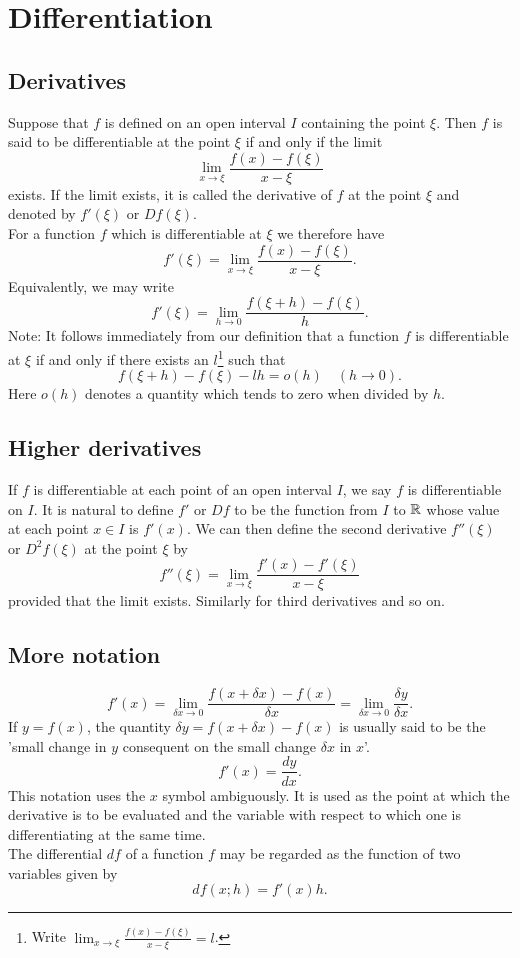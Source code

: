 \documentclass[10pt, a4paper]{article}
\begin{document}
\newpage

\section{Differentiation}

\subsection{Derivatives}
Suppose that $f$ is defined on an open interval $I$ containing the point $\xi$. Then $f$ is said to be differentiable at the point $\xi$ if and only if the limit
\[
\lim_{x \rightarrow \xi}{\dfrac{f(x) - f(\xi)}{x - \xi}}
\]
exists. If the limit exists, it is called the derivative of $f$ at the point $\xi$ and denoted by $f'(\xi)$ or $Df(\xi)$. \\
For a function $f$ which is differentiable at $\xi$ we therefore have
\[
f'(\xi) = \lim_{x \rightarrow \xi}{\dfrac{f(x) - f(\xi)}{x - \xi}}.
\]
Equivalently, we may write
\[
f'(\xi) = \lim_{h \rightarrow 0}{\dfrac{f(\xi + h) - f(\xi)}{h}}.
\]
Note: It follows immediately from our definition that a function $f$ is differentiable at $\xi$ if and only if there exists an $l$\footnote{Write $\lim_{x \rightarrow \xi}{\frac{f(x) - f(\xi)}{x - \xi}} = l$.} such that
\[f(\xi + h) - f(\xi) - lh = o(h)\quad(h \rightarrow 0).\]
Here $o(h)$ denotes a quantity which tends to zero when divided by $h$.

\subsection{Higher derivatives}
If $f$ is differentiable at each point of an open interval $I$, we say $f$ is differentiable on $I$. It is natural to define $f'$ or $Df$ to be the function from $I$ to $\mathbb{R}$ whose value at each point $x \in I$ is $f'(x)$. We can then define the second derivative $f''(\xi)$ or $D ^ 2 f(\xi)$ at the point $\xi$ by
\[
f''(\xi) = \lim_{x \rightarrow \xi}{\dfrac{f'(x) - f'(\xi)}{x - \xi}}
\]
provided that the limit exists. Similarly for third derivatives and so on.

\subsection{More notation}
\[
f'(x) = \lim_{\delta x \rightarrow 0}{\dfrac{f(x + \delta x) - f(x)}{\delta x}} = \lim_{\delta x \rightarrow 0}{\dfrac{\delta y}{\delta x}}.
\]
If $y = f(x)$, the quantity $\delta y = f(x + \delta x) - f(x)$ is usually said to be the 'small change in $y$ consequent on the small change $\delta x$ in $x$'.
\[
f'(x) = \dfrac{dy}{dx}.
\]
This notation uses the $x$ symbol ambiguously. It is used as the point at which the derivative is to be evaluated and the variable with respect to which one is differentiating at the same time. \\
The differential $df$ of a function $f$ may be regarded as the function of two variables given by
\[
df(x; h) = f'(x)h.
\]
\end{document}

